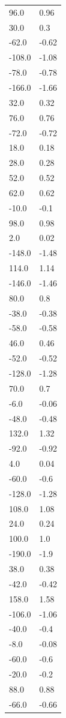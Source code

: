 \begin{longtable}{ll}
96.0 & 0.96 \\
30.0 & 0.3 \\
-62.0 & -0.62 \\
-108.0 & -1.08 \\
-78.0 & -0.78 \\
-166.0 & -1.66 \\
32.0 & 0.32 \\
76.0 & 0.76 \\
-72.0 & -0.72 \\
18.0 & 0.18 \\
28.0 & 0.28 \\
52.0 & 0.52 \\
62.0 & 0.62 \\
-10.0 & -0.1 \\
98.0 & 0.98 \\
2.0 & 0.02 \\
-148.0 & -1.48 \\
114.0 & 1.14 \\
-146.0 & -1.46 \\
80.0 & 0.8 \\
-38.0 & -0.38 \\
-58.0 & -0.58 \\
46.0 & 0.46 \\
-52.0 & -0.52 \\
-128.0 & -1.28 \\
70.0 & 0.7 \\
-6.0 & -0.06 \\
-48.0 & -0.48 \\
132.0 & 1.32 \\
-92.0 & -0.92 \\
4.0 & 0.04 \\
-60.0 & -0.6 \\
-128.0 & -1.28 \\
108.0 & 1.08 \\
24.0 & 0.24 \\
100.0 & 1.0 \\
-190.0 & -1.9 \\
38.0 & 0.38 \\
-42.0 & -0.42 \\
158.0 & 1.58 \\
-106.0 & -1.06 \\
-40.0 & -0.4 \\
-8.0 & -0.08 \\
-60.0 & -0.6 \\
-20.0 & -0.2 \\
88.0 & 0.88 \\
-66.0 & -0.66 \\

\end{longtable}
